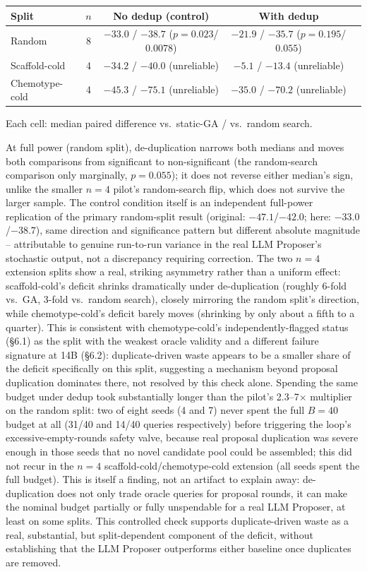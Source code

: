 \documentclass{article}
\begin{document}
\begin{center}
\begin{tabular}{@{}lcccc@{}}
\toprule
Split & $n$ & No dedup (control) & With dedup \\
\midrule
Random & 8 & $-33.0$ / $-38.7$ ($p=0.023$/$0.0078$) & $-21.9$ / $-35.7$ ($p=0.195$/$0.055$) \\
Scaffold-cold & 4 & $-34.2$ / $-40.0$ (unreliable) & $-5.1$ / $-13.4$ (unreliable) \\
Chemotype-cold & 4 & $-45.3$ / $-75.1$ (unreliable) & $-35.0$ / $-70.2$ (unreliable) \\
\bottomrule
\end{tabular}
\end{center}
{\small Each cell: median paired difference vs.\ static-GA / vs.\ random search.}

At full power (random split), de-duplication narrows both medians and moves both comparisons from significant to non-significant (the random-search comparison only marginally, $p=0.055$); it does not reverse either median's sign, unlike the smaller $n=4$ pilot's random-search flip, which does not survive the larger sample. The control condition itself is an independent full-power replication of the primary random-split result (original: $-47.1$/$-42.0$; here: $-33.0$/$-38.7$), same direction and significance pattern but different absolute magnitude -- attributable to genuine run-to-run variance in the real LLM Proposer's stochastic output, not a discrepancy requiring correction. The two $n=4$ extension splits show a real, striking asymmetry rather than a uniform effect: scaffold-cold's deficit shrinks dramatically under de-duplication (roughly 6-fold vs.\ GA, 3-fold vs.\ random search), closely mirroring the random split's direction, while chemotype-cold's deficit barely moves (shrinking by only about a fifth to a quarter). This is consistent with chemotype-cold's independently-flagged status (\S6.1) as the split with the weakest oracle validity and a different failure signature at 14B (\S6.2): duplicate-driven waste appears to be a smaller share of the deficit specifically on this split, suggesting a mechanism beyond proposal duplication dominates there, not resolved by this check alone. Spending the same budget under dedup took substantially longer than the pilot's 2.3--7$\times$ multiplier on the random split: two of eight seeds (4 and 7) never spent the full $B=40$ budget at all (31/40 and 14/40 queries respectively) before triggering the loop's excessive-empty-rounds safety valve, because real proposal duplication was severe enough in those seeds that no novel candidate pool could be assembled; this did not recur in the $n=4$ scaffold-cold/chemotype-cold extension (all seeds spent the full budget). This is itself a finding, not an artifact to explain away: de-duplication does not only trade oracle queries for proposal rounds, it can make the nominal budget partially or fully unspendable for a real LLM Proposer, at least on some splits. This controlled check supports duplicate-driven waste as a real, substantial, but split-dependent component of the deficit, without establishing that the LLM Proposer outperforms either baseline once duplicates are removed.
\end{document}
